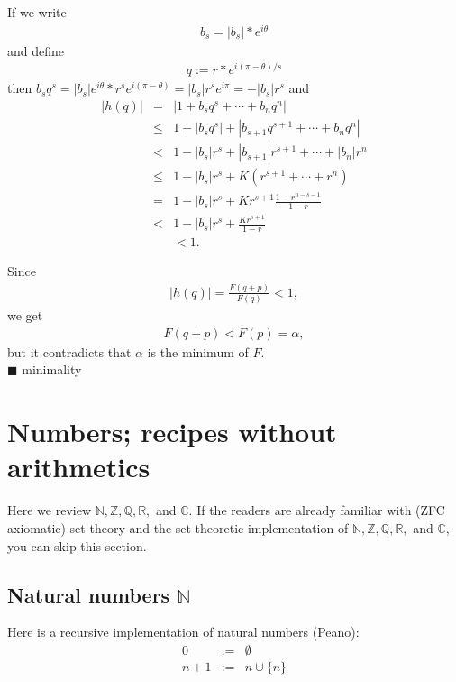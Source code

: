 \documentclass[11pt]{book}
\begin{document}
If we write
\begin{eqnarray}
b_s = |b_s| * e^{i \theta}
\end{eqnarray}
and define
\begin{eqnarray}
q := r * e^{i (\pi - \theta)/s}
\end{eqnarray}
then $b_s q^s = |b_s| e^{i\theta} * r^s e^{i(\pi-\theta)} = |b_s| r^s e^{i\pi} = - |b_s| r^s$ and
\begin{eqnarray}
|h(q)| &=& |1 + b_s q^s + \cdots + b_n q^n| \\
&\leq& 1 + |b_s q^s| + |b_{s+1} q^{s+1} + \cdots + b_n q^n| \\
&<& 1 - |b_s| r^s + |b_{s+1}| r^{s+1} + \cdots + |b_n| r^n \\
&\leq& 1 - |b_s| r^s + K\left( r^{s+1} + \cdots + r^n \right) \\
&=& 1 - |b_s| r^s + K r^{s+1} \frac{1 - r^{n-s-1}}{1-r} \\
&<& 1 - |b_s| r^s + \frac{K r^{s+1}}{1-r} \\
&&< 1.
\end{eqnarray}

Since 
\begin{eqnarray}
|h(q)| = \frac{F(q+p)}{F(q)} < 1,
\end{eqnarray}
we get
\begin{eqnarray}
F(q+p) < F(p) = \alpha,
\end{eqnarray}
but it contradicts that $\alpha$ is the minimum of $F$.\\
$\blacksquare$
minimality 

\section{Numbers; recipes without arithmetics}
Here we review $\mathbb{N, Z, Q, R},$ and $\mathbb{C}$.
If the readers are already familiar with (ZFC axiomatic) set theory and the set theoretic implementation of $\mathbb{N, Z, Q, R},$ and $\mathbb{C}$, you can skip this section.

\subsection{Natural numbers $\mathbb{N}$}
Here is a recursive implementation of natural numbers (Peano):
\begin{eqnarray}
0 &:=& \emptyset \\
n+1 &:=& n \cup \{n\}
\end{eqnarray}
\end{document}

